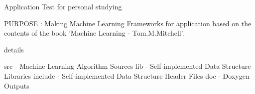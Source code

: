Application Test for personal studying

P\-U\-R\-P\-O\-S\-E \-: Making Machine Learning Frameworks for application based on the contents of the book 'Machine Learning -\/ Tom.\-M.\-Mitchell'.


\begin{DoxyItemize}
\item details
\end{DoxyItemize}

src -\/ Machine Learning Algorithm Sources lib -\/ Self-\/implemented Data Structure Libraries include -\/ Self-\/implemented Data Structure Header Files doc -\/ Doxygen Outputs 